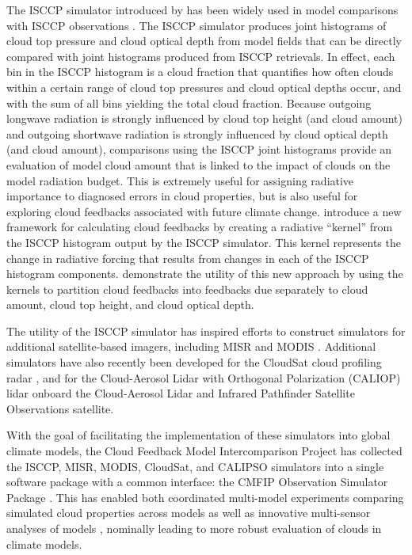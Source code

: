 The ISCCP simulator introduced by \citet{klein_and_jakob_1999} has been
widely used in model comparisons with ISCCP observations
\citep{webb_et_al_2001, norris_and_weaver_2001, lin_and_zhang_2004, zhang_et_al_2005, wyant_et_al_2006, klein_et_al_2013}.
The ISCCP simulator produces joint histograms of cloud top pressure and
cloud optical depth from model fields that can be directly compared with
joint histograms produced from ISCCP retrievals. In effect, each bin in
the ISCCP histogram is a cloud fraction that quantifies how often clouds
within a certain range of cloud top pressures and cloud optical depths
occur, and with the sum of all bins yielding the total cloud fraction.
Because outgoing longwave radiation is strongly influenced by cloud top
height (and cloud amount) and outgoing shortwave radiation is strongly
influenced by cloud optical depth (and cloud amount), comparisons using
the ISCCP joint histograms provide an evaluation of model cloud amount
that is linked to the impact of clouds on the model radiation budget.
This is extremely useful for assigning radiative importance to diagnosed
errors in cloud properties, but is also useful for exploring cloud
feedbacks associated with future climate change.
\citet{zelinka_et_al_2012a} introduce a new framework for calculating
cloud feedbacks by creating a radiative ``kernel'' from the ISCCP
histogram output by the ISCCP simulator. This kernel represents the
change in radiative forcing that results from changes in each of the
ISCCP histogram components. \citet{zelinka_et_al_2012b} demonstrate the
utility of this new approach by using the kernels to partition cloud
feedbacks into feedbacks due separately to cloud amount, cloud top
height, and cloud optical depth.

The utility of the ISCCP simulator has inspired efforts to construct
simulators for additional satellite-based imagers, including MISR
\citep{marchand_and_ackerman_2010} and MODIS \citep{pincus_et_al_2012}.
Additional simulators have also recently been developed for the CloudSat
\citep{stephens_et_al_2002} cloud profiling radar
\citep[Quickbeam;][]{haynes_et_al_2007}, and for the Cloud-Aerosol Lidar
with Orthogonal Polarization (CALIOP) lidar \citep{chepfer_et_al_2008}
onboard the Cloud-Aerosol Lidar and Infrared Pathfinder Satellite
Observations \citep[CALIPSO;][]{winker_et_al_2007} satellite.

With the goal of facilitating the implementation of these simulators
into global climate models, the Cloud Feedback Model Intercomparison
Project \citep[CFMIP;][]{webb_et_al_2016} has collected the ISCCP, MISR,
MODIS, CloudSat, and CALIPSO simulators into a single software package
with a common interface: the CMFIP Observation Simulator Package
\citep[COSP;][]{bodas-salcedo_et_al_2011}. This has enabled both
coordinated multi-model experiments comparing simulated cloud properties
across models as well as innovative multi-sensor analyses of models
\citep[e.g.,][]{bodas-salcedo_et_al_2011, kay_et_al_2012, klein_et_al_2013, franklin_et_al_2013a, franklin_et_al_2013b},
nominally leading to more robust evaluation of clouds in climate models.

